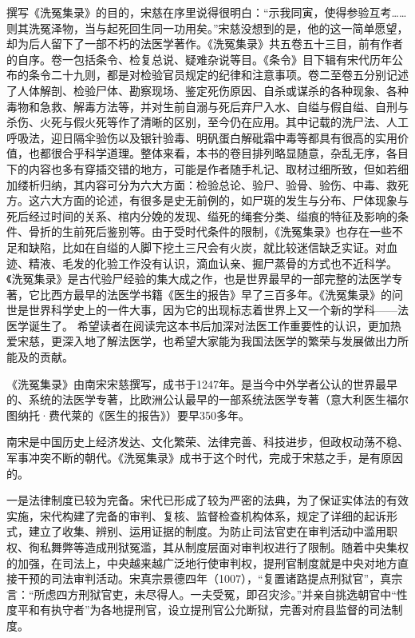 \documentclass[12pt,UTF8]{ctexbook}
\begin{document}
撰写《洗冤集录》的目的，宋慈在序里说得很明白：“示我同寅，使得参验互考……则其洗冤泽物，当与起死回生同一功用矣。”宋慈没想到的是，他的这一简单愿望，却为后人留下了一部不朽的法医学著作。《洗冤集录》共五卷五十三目，前有作者的自序。卷一包括条令、检复总说、疑难杂说等目。《条令》目下辑有宋代历年公布的条令二十九则，都是对检验官员规定的纪律和注意事项。卷二至卷五分别记述了人体解剖、检验尸体、勘察现场、鉴定死伤原因、自杀或谋杀的各种现象、各种毒物和急救、解毒方法等，并对生前自溺与死后弃尸入水、自缢与假自缢、自刑与杀伤、火死与假火死等作了清晰的区别，至今仍在应用。其中记载的洗尸法、人工呼吸法，迎日隔伞验伤以及银针验毒、明矾蛋白解砒霜中毒等都具有很高的实用价值，也都很合乎科学道理。整体来看，本书的卷目排列略显随意，杂乱无序，各目下的内容也多有穿插交错的地方，可能是作者随手札记、取材过细所致，但如若细加缕析归纳，其内容可分为六大方面：检验总论、验尸、验骨、验伤、中毒、救死方。这六大方面的论述，有很多是史无前例的，如尸斑的发生与分布、尸体现象与死后经过时间的关系、棺内分娩的发现、缢死的绳套分类、缢痕的特征及影响的条件、骨折的生前死后鉴别等。由于受时代条件的限制，《洗冤集录》也存在一些不足和缺陷，比如在自缢的人脚下挖土三尺会有火炭，就比较迷信缺乏实证。对血迹、精液、毛发的化验工作没有认识，滴血认亲、掘尸蒸骨的方式也不近科学。《洗冤集录》是古代验尸经验的集大成之作，也是世界最早的一部完整的法医学专著，它比西方最早的法医学书籍《医生的报告》早了三百多年。《洗冤集录》的问世是世界科学史上的一件大事，因为它的出现标志着世界上又一个新的学科——法医学诞生了。
希望读者在阅读完这本书后加深对法医工作重要性的认识，更加热爱宋慈，更深入地了解法医学，也希望大家能为我国法医学的繁荣与发展做出力所能及的贡献。

《洗冤集录》由南宋宋慈撰写，成书于1247年。是当今中外学者公认的世界最早的、系统的法医学专著，比欧洲公认最早的一部系统法医学专著（意大利医生福尔图纳托·费代莱的《医生的报告》）要早350多年。

南宋是中国历史上经济发达、文化繁荣、法律完善、科技进步，但政权动荡不稳、军事冲突不断的朝代。《洗冤集录》成书于这个时代，完成于宋慈之手，是有原因的。

一是法律制度已较为完备。宋代已形成了较为严密的法典，为了保证实体法的有效实施，宋代构建了完备的审判、复核、监督检查机构体系，规定了详细的起诉形式，建立了收集、辨别、运用证据的制度。为防止司法官吏在审判活动中滥用职权、徇私舞弊等造成刑狱冤滥，其从制度层面对审判权进行了限制。随着中央集权的加强，在司法上，中央越来越广泛地行使审判权，提刑官制度就是中央对地方直接干预的司法审判活动。宋真宗景德四年（1007），“复置诸路提点刑狱官”，真宗言：“所虑四方刑狱官吏，未尽得人。一夫受冤，即召灾沴。”并亲自挑选朝官中“性度平和有执守者”为各地提刑官，设立提刑官公允断狱，完善对府县监督的司法制度。
\end{document}
